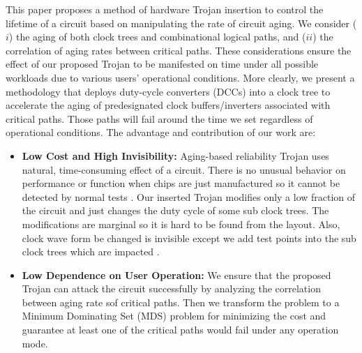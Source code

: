 This paper proposes a method of hardware Trojan insertion to control the lifetime of a circuit based on manipulating the rate of circuit aging. We consider ($i$) the aging of both clock trees and combinational logical paths, and ($ii$) the correlation of aging rates between critical paths. These considerations ensure the effect of our proposed Trojan to be manifested on time under all possible workloads due to various users' operational conditions. More clearly, we present a methodology that deploys duty-cycle converters (DCCs) into a clock tree to accelerate the aging of predesignated clock buffers/inverters associated with critical paths. Those paths will fail around the time we set regardless of operational conditions. The advantage and contribution of our work are:
\begin{itemize}
	\item \textbf{Low Cost and High Invisibility:} Aging-based reliability Trojan uses natural, time-consuming effect of a circuit. There is no unusual behavior on performance or function when chips are just manufactured so it cannot be detected by normal tests \cite{sreedhar2012reliability}. Our inserted Trojan modifies only a low fraction of the circuit and just changes the duty cycle of some sub clock trees. The modifications are marginal so it is hard to be found from the layout. Also, clock wave form be changed is invisible except we add test points into the sub clock trees which are impacted \cite{sreedhar2012reliability}.
	\item \textbf{Low Dependence on User Operation:} We ensure that the proposed Trojan can attack the circuit successfully by analyzing the correlation between aging rate sof critical paths. Then we transform the problem to a Minimum Dominating Set (MDS) problem for minimizing the cost and guarantee at least one of the critical paths would fail under any operation mode.
\end{itemize}
